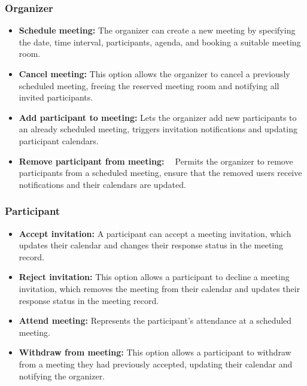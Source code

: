 \subsubsection{Organizer}\label{D22J7NC9_wT__idxntpE6}

\begin{itemize}
\item
\protect{}\label{-VGQ2LkiJM8z4t-uJgDW1}
\textbf{Schedule meeting:} The organizer can create a new meeting by specifying the date, time interval, participants, agenda, and booking a suitable meeting room.
\item
\protect{}\label{vMkOTcPRtTKk0KasT8h7N}
\textbf{Cancel meeting:} This option allows the organizer to cancel a previously scheduled meeting, freeing the reserved meeting room and notifying all invited participants.
\item
\protect{}\label{YSoRVsS6bTmd39UKYpnIS}
\textbf{Add participant to meeting:} Lets the organizer add new participants to an already scheduled meeting, triggers invitation notifications and updating participant calendars.
\item
\protect{}\label{mslLhZXz8VRQXuiA3_09j}
\textbf{Remove participant from meeting: ~} Permits the organizer to remove participants from a scheduled meeting, ensure that the removed users receive notifications and their calendars are updated.
\end{itemize}

\subsubsection{Participant}\label{2iZXgFJcybn501SNioA-I}

\begin{itemize}
\item
\protect{}\label{ZtDdjfsnkrPGbkl1Sh_9k}
\textbf{Accept invitation:} A participant can accept a meeting invitation, which updates their calendar and changes their response status in the meeting record.
\item
\protect{}\label{9oMjuE2RS-Zncw_ZKUKH_}
\textbf{Reject invitation:} This option allows a participant to decline a meeting invitation, which removes the meeting from their calendar and updates their response status in the meeting record.
\item
\protect{}\label{D-MzDyI1Mg2rP46dQj5iC}
\textbf{Attend meeting:} Represents the participant's attendance at a scheduled meeting.
\item
\protect{}\label{ps7tWqI9c_fMvifNi306D}
\textbf{Withdraw from meeting:} This option allows a participant to withdraw from a meeting they had previously accepted, updating their calendar and notifying the organizer.
\end{itemize}

